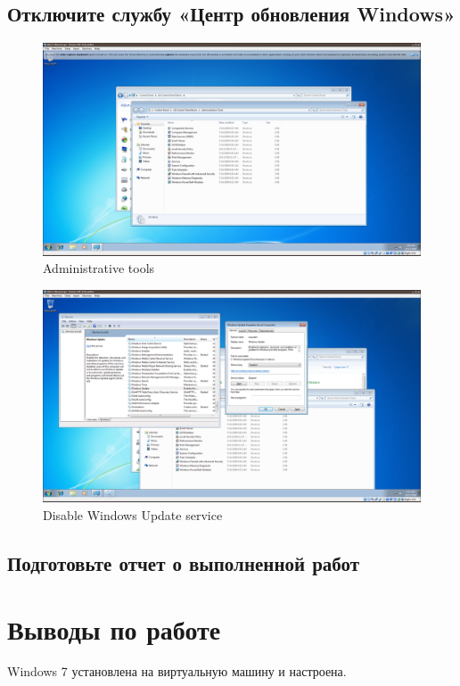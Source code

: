 \documentclass[a4paper]{article}
\begin{document}
\subsection{Отключите службу «Центр обновления Windows»}
\begin{figure}[H]
    \centering
    \includegraphics[width=\linewidth]{55.png}
    \caption{Administrative tools}
\end{figure}

\begin{figure}[H]
    \centering
    \includegraphics[width=\linewidth]{56.png}
    \caption{Disable Windows Update service}
\end{figure}

\subsection{Подготовьте отчет о выполненной работ}


\section{Выводы по работе}

Windows 7 установлена на виртуальную машину и настроена.
\end{document}
